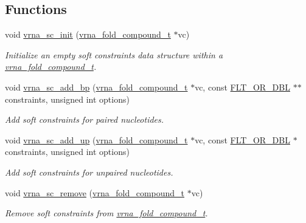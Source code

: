\subsection*{Functions}
\begin{DoxyCompactItemize}
\item 
void \hyperlink{group__soft__constraints_ga9d977a1681356778cc66dceafbe5b032}{vrna\+\_\+sc\+\_\+init} (\hyperlink{group__fold__compound_ga1b0cef17fd40466cef5968eaeeff6166}{vrna\+\_\+fold\+\_\+compound\+\_\+t} $\ast$vc)
\begin{DoxyCompactList}\small\item\em Initialize an empty soft constraints data structure within a \hyperlink{group__fold__compound_ga1b0cef17fd40466cef5968eaeeff6166}{vrna\+\_\+fold\+\_\+compound\+\_\+t}. \end{DoxyCompactList}\item 
void \hyperlink{group__soft__constraints_ga86049d4bb0ea8674cae9b6177156b184}{vrna\+\_\+sc\+\_\+add\+\_\+bp} (\hyperlink{group__fold__compound_ga1b0cef17fd40466cef5968eaeeff6166}{vrna\+\_\+fold\+\_\+compound\+\_\+t} $\ast$vc, const \hyperlink{group__data__structures_ga31125aeace516926bf7f251f759b6126}{F\+L\+T\+\_\+\+O\+R\+\_\+\+D\+B\+L} $\ast$$\ast$constraints, unsigned int options)
\begin{DoxyCompactList}\small\item\em Add soft constraints for paired nucleotides. \end{DoxyCompactList}\item 
void \hyperlink{group__soft__constraints_ga30f30c8eff9676775a3e831d972b5284}{vrna\+\_\+sc\+\_\+add\+\_\+up} (\hyperlink{group__fold__compound_ga1b0cef17fd40466cef5968eaeeff6166}{vrna\+\_\+fold\+\_\+compound\+\_\+t} $\ast$vc, const \hyperlink{group__data__structures_ga31125aeace516926bf7f251f759b6126}{F\+L\+T\+\_\+\+O\+R\+\_\+\+D\+B\+L} $\ast$constraints, unsigned int options)
\begin{DoxyCompactList}\small\item\em Add soft constraints for unpaired nucleotides. \end{DoxyCompactList}\item 
void \hyperlink{group__soft__constraints_ga73cdc07b9a199c614367bebef0f2c41a}{vrna\+\_\+sc\+\_\+remove} (\hyperlink{group__fold__compound_ga1b0cef17fd40466cef5968eaeeff6166}{vrna\+\_\+fold\+\_\+compound\+\_\+t} $\ast$vc)
\begin{DoxyCompactList}\small\item\em Remove soft constraints from \hyperlink{group__fold__compound_ga1b0cef17fd40466cef5968eaeeff6166}{vrna\+\_\+fold\+\_\+compound\+\_\+t}. \end{DoxyCompactList}\item 
$$
\end{DoxyCompactItemize}
